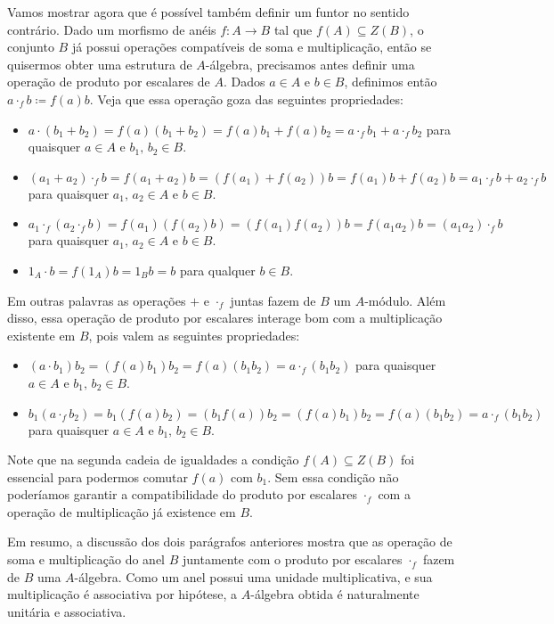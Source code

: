 Vamos mostrar agora que é possível também definir um funtor no sentido contrário.
Dado um morfismo de anéis $f: A \to B$ tal que $f(A) \subseteq Z(B)$, o conjunto $B$ já possui operações compatíveis de soma e multiplicação, então se quisermos obter uma estrutura de $A$-álgebra, precisamos antes definir uma operação de produto por escalares de $A$.
Dados $a \in A$ e $b \in B$, definimos então $a \cdot_{f} b \coloneqq f(a)b$.
Veja que essa operação goza das seguintes propriedades:
\begin{itemize}
\item $a \cdot (b_{1}+b_{2}) = f(a)(b_{1}+b_{2}) = f(a)b_{1} + f(a)b_{2} = a \cdot_{f} b_{1} + a \cdot_{f} b_{2}$ para quaisquer $a \in A$ e $b_{1},\, b_{2} \in B$.
  
\item $(a_{1}+a_{2}) \cdot_{f} b = f(a_{1}+a_{2})b = (f(a_{1})+f(a_{2}))b = f(a_{1})b + f(a_{2})b = a_{1} \cdot_{f} b + a_{2} \cdot_{f} b$ para quaisquer $a_{1},\, a_{2} \in A$ e $b \in B$.
  
\item $a_{1} \cdot_{f} (a_{2} \cdot_{f} b) = f(a_{1})(f(a_{2})b) = (f(a_{1})f(a_{2}))b = f(a_{1}a_{2})b = (a_{1}a_{2}) \cdot_{f} b$ para quaisquer $a_{1},\,a_{2} \in A$ e $b \in B$.
  
\item $1_{A} \cdot b = f(1_{A})b = 1_{B}b = b$ para qualquer $b \in B$.
\end{itemize}

Em outras palavras as operações $+$ e $\cdot_{f}$ juntas fazem de $B$ um $A$-módulo.
Além disso, essa operação de produto por escalares interage bom com a multiplicação existente em $B$, pois valem as seguintes propriedades:
\begin{itemize}
\item $(a \cdot b_{1})b_{2} = (f(a)b_{1})b_{2} = f(a)(b_{1}b_{2}) = a \cdot_{f} (b_{1}b_{2})$ para quaisquer $a \in A$ e $b_{1},\, b_{2} \in B$.
  
\item $b_{1}(a \cdot_{f} b_{2}) = b_{1}(f(a)b_{2}) = (b_{1}f(a))b_{2} = (f(a)b_{1})b_{2} = f(a)(b_{1}b_{2}) = a \cdot_{f}(b_{1}b_{2})$ para quaisquer $a \in A$ e $b_{1},\, b_{2} \in B$.
\end{itemize}
Note que na segunda cadeia de igualdades a condição $f(A) \subseteq Z(B)$ foi essencial para podermos comutar $f(a)$ com $b_{1}$.
Sem essa condição não poderíamos garantir a compatibilidade do produto por escalares $\cdot_{f}$ com a operação de multiplicação já existence em $B$.

Em resumo, a discussão dos dois parágrafos anteriores mostra que as operação de soma e multiplicação do anel $B$ juntamente com o produto por escalares $\cdot_{f}$ fazem de $B$ uma $A$-álgebra.
Como um anel possui uma unidade multiplicativa, e sua multiplicação é associativa por hipótese, a $A$-álgebra obtida é naturalmente unitária e associativa.



